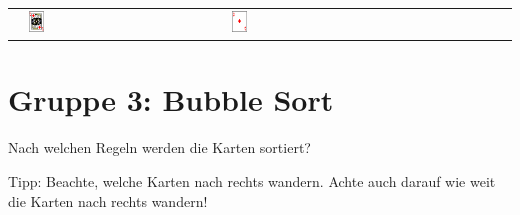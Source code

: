 \begin{tabular}{m{30mm}m{11mm}m{11mm}m{11mm}m{11mm}m{11mm}m{11mm}m{11mm}m{11mm}}
&
\includegraphics[width=0.08\textwidth]{./inf/SEKII/19_Java_Sortierverfahren/KaroKoenig.png}
&
\includegraphics[width=0.08\textwidth]{./inf/SEKII/19_Java_Sortierverfahren/KaroAs.png}
\\
\end{tabular}

\clearpage


\section{Gruppe 3: Bubble Sort}

Nach welchen Regeln werden die Karten sortiert?

Tipp: Beachte, welche Karten nach rechts wandern. Achte auch darauf wie weit die
Karten nach rechts wandern!

